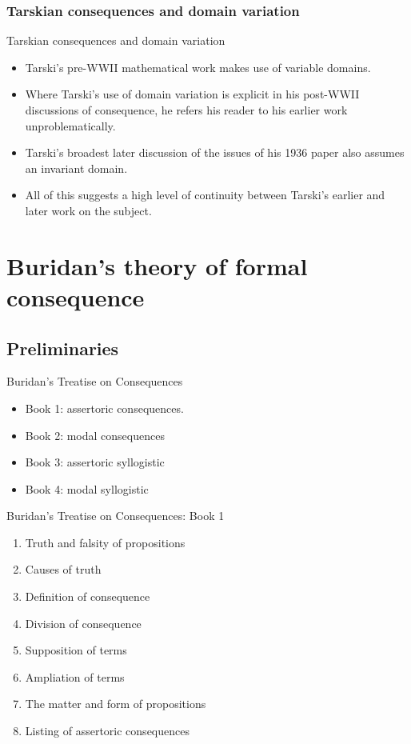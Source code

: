\documentclass{beamer}
\begin{document}
\subsubsection{Tarskian consequences and domain variation}
\begin{frame}{Tarskian consequences and domain variation}
	\begin{itemize}
		\pause 
		\item Tarski's pre-WWII mathematical work makes use of variable domains.
		\pause
		\item Where Tarski's use of domain variation is explicit in his post-WWII discussions of consequence, he refers his reader to his earlier work unproblematically.
		\pause 
		\item Tarski's broadest later discussion of the issues of his 1936 paper also assumes an invariant domain. 
		\pause
		\item All of this suggests a high level of continuity between Tarski's earlier and later work on the subject.	
	\end{itemize}
\end{frame}

\section{Buridan's theory of formal consequence}
\subsection{Preliminaries}
\begin{frame}{Buridan's Treatise on Consequences}
	\begin{itemize}
		\item Book 1: assertoric consequences.
		\item Book 2: modal consequences
		\item Book 3: assertoric syllogistic
		\item Book 4: modal syllogistic
	\end{itemize}
\end{frame}

\begin{frame}{Buridan's Treatise on Consequences: Book 1}
	\begin{enumerate}
		\item Truth and falsity of propositions
		\item Causes of truth
		\item Definition of consequence
		\item Division of consequence
		\item Supposition of terms
		\item Ampliation of terms
		\item The matter and form of propositions
		\item Listing of assertoric consequences		
	\end{enumerate}
\end{frame}
\end{document}
